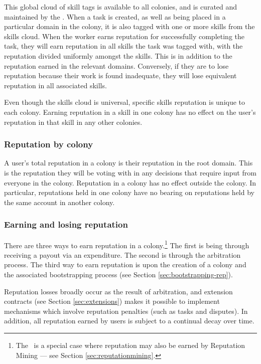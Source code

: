 This global cloud of skill tags is available to all colonies, and is curated and maintained by the \rc. When a task is created, as well as being placed in a particular domain in the colony, it is also tagged with one or more skills from the skills cloud. When the worker earns reputation for successfully completing the task, they will earn reputation in all skills the task was tagged with, with the reputation divided uniformly amongst the skills. This is in addition to the reputation earned in the relevant domains. Conversely, if they are to lose reputation because their work is found inadequate, they will lose equivalent reputation in all associated skills.

Even though the skills cloud is universal, specific skills reputation is unique to each colony. Earning reputation in a skill in one colony has no effect on the user's reputation in that skill in any other colonies.

\subsubsection*{Reputation by colony}\label{sec:rep-by-colony}

A user's total reputation in a colony is their reputation in the root domain. This is the reputation they will be voting with in any decisions that require input from everyone in the colony. Reputation in a colony has no effect outside the colony. In particular, reputations held in one colony have no bearing on reputations held by the same account in another colony.

\subsubsection{Earning and losing reputation}\label{sec:earning-losing-rep}

There are three ways to earn reputation in a colony.\footnote{The \rc\ is a special case where reputation may also be earned by Reputation Mining --- see Section \ref{sec:reputationmining}.} The first is being through receiving a payout via an expenditure. The second is through the arbitration process. The third way to earn reputation is upon the creation of a colony and the associated bootstrapping process (see Section \ref{sec:bootstrapping-rep}).

Reputation losses broadly occur as the result of arbitration, and extension contracts (see Section \ref{sec:extensions}) makes it possible to implement mechanisms which involve reputation penalties (such as tasks and disputes). In addition, all reputation earned by users is subject to a continual decay over time.

